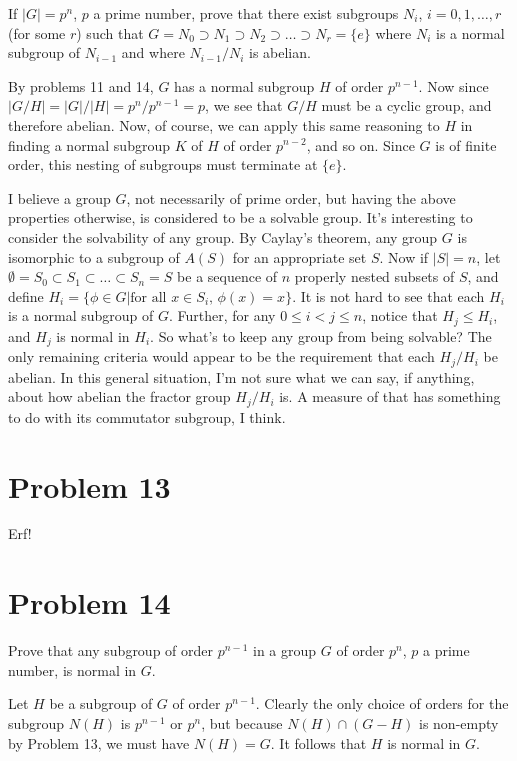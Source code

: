 \documentclass[12pt]{article}
\begin{document}
If $|G|=p^n$, $p$ a prime number, prove that there exist subgroups
$N_i$, $i=0,1,\dots,r$ (for some $r$) such that $G=N_0\supset N_1\supset N_2\supset\dots\supset N_r=\{e\}$
where $N_i$ is a normal subgroup of $N_{i-1}$ and where $N_{i-1}/N_i$ is abelian.

By problems 11 and 14, $G$ has a normal subgroup $H$ of order $p^{n-1}$.  Now since $|G/H|=|G|/|H|=p^n/p^{n-1}=p$,
we see that $G/H$ must be a cyclic group, and therefore abelian.
Now, of course, we can apply this same reasoning to $H$ in finding a normal subgroup $K$ of $H$ of order $p^{n-2}$,
and so on.  Since $G$ is of finite order, this nesting of subgroups must terminate at $\{e\}$.

I believe a group $G$, not necessarily of prime order, but having the above properties otherwise,
is considered to be a solvable group.  It's interesting to consider the solvability of any group.
By Caylay's theorem, any group $G$ is isomorphic to a subgroup of $A(S)$ for an appropriate set $S$.
Now if $|S|=n$, let $\emptyset=S_0\subset S_1\subset\dots\subset S_n=S$ be a sequence of $n$ properly nested
subsets of $S$, and define $H_i=\{\phi\in G|\mbox{for all $x\in S_i$, $\phi(x)=x$}\}$.  It is not hard to see
that each $H_i$ is a normal subgroup of $G$.
Further, for any $0\leq i<j\leq n$, notice that $H_j\leq H_i$, and $H_j$ is normal in $H_i$.  So what's to keep
any group from being solvable?  The only remaining criteria would appear to be the requirement that each $H_j/H_i$ be abelian.
In this general situation, I'm not sure what we can say, if anything, about how abelian the fractor group $H_j/H_i$ is.
A measure of that has something to do with its commutator subgroup, I think.


\section*{Problem 13}

Erf!

\section*{Problem 14}

Prove that any subgroup of order $p^{n-1}$ in a group $G$ of order $p^n$, $p$ a prime number, is normal in $G$.

Let $H$ be a subgroup of $G$ of order $p^{n-1}$.  Clearly the only choice of orders
for the subgroup $N(H)$ is $p^{n-1}$ or $p^n$, but because $N(H)\cap(G-H)$ is non-empty
by Problem 13, we must have $N(H)=G$.  It follows that $H$ is normal in $G$.
\end{document}
